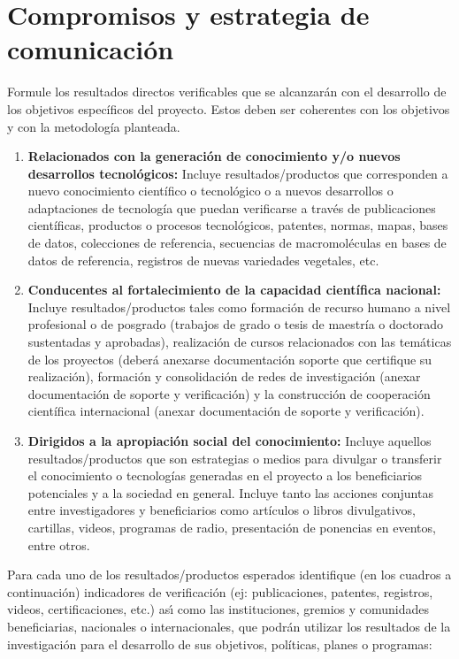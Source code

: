 \section{ Compromisos y estrategia de comunicación }
\begin{instrucciones}
  Formule los resultados directos verificables que se
alcanzarán con el desarrollo de los objetivos específicos del proyecto. Estos deben ser coherentes
con los objetivos y con la metodología planteada.


  \begin{enumerate}
  \item \textbf{Relacionados con la generación de conocimiento y/o nuevos desarrollos
 tecnológicos:} Incluye resultados/productos que corresponden a nuevo
 conocimiento científico o tecnológico o a nuevos desarrollos o adaptaciones de
 tecnología que puedan verificarse a través de publicaciones científicas,
 productos o procesos tecnológicos, patentes, normas, mapas, bases de datos,
 colecciones de referencia, secuencias de macromoléculas en bases de datos de
 referencia, registros de nuevas variedades vegetales, etc.
\item \textbf{Conducentes al fortalecimiento de la capacidad científica
  nacional:} Incluye resultados/productos tales como formación de
  recurso humano a nivel profesional o de posgrado (trabajos de grado
  o tesis de maestría o doctorado sustentadas y aprobadas),
  realización de cursos relacionados con las temáticas de los
  proyectos (deberá anexarse documentación soporte que certifique su
  realización), formación y consolidación de redes de investigación
  (anexar documentación de soporte y verificación) y la construcción
  de cooperación científica internacional (anexar documentación de
  soporte y verificación).
\item \textbf{Dirigidos a la apropiación social del conocimiento:}
  Incluye aquellos resultados/productos que son estrategias o medios
  para divulgar o transferir el conocimiento o tecnologías generadas
  en el proyecto a los beneficiarios potenciales y a la sociedad en
  general. Incluye tanto las acciones conjuntas entre investigadores y
  beneficiarios como artículos o libros divulgativos, cartillas,
  videos, programas de radio, presentación de ponencias en eventos,
  entre otros.
  \end{enumerate}

  Para cada uno de los resultados/productos esperados identifique (en
  los cuadros a continuación) indicadores de verificación (ej:
  publicaciones, patentes, registros, videos, certificaciones, etc.)
  as\'\i{} como las instituciones, gremios y comunidades beneficiarias,
  nacionales o internacionales, que podrán utilizar los resultados de
  la investigación para el desarrollo de sus objetivos, políticas,
  planes o programas:

\end{instrucciones}

